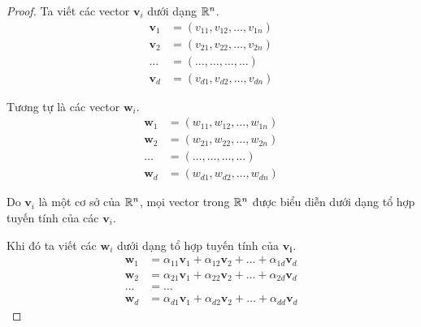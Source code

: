 \begin{proof}
    Ta viết các vector $\bm{v}_i$ dưới dạng $\mathbb{R}^n$.
    \begin{align*}
        \bm{v}_1 & = (v_{11}, v_{12}, \ldots, v_{1n}) \\
        \bm{v}_2 & = (v_{21}, v_{22}, \ldots, v_{2n}) \\
        \ldots & = (\ldots, \ldots, \ldots, \ldots) \\
        \bm{v}_d & = (v_{d1}, v_{d2}, \ldots, v_{dn})
    \end{align*}

    Tương tự là các vector $\bm{w}_i$.
    \begin{align*}
        \bm{w}_1 & = (w_{11}, w_{12}, \ldots, w_{1n}) \\
        \bm{w}_2 & = (w_{21}, w_{22}, \ldots, w_{2n}) \\
        \ldots & = (\ldots, \ldots, \ldots, \ldots) \\
        \bm{w}_d & = (w_{d1}, w_{d2}, \ldots, w_{dn})
    \end{align*}

    Do $\bm{v}_i$ là một cơ sở của $\mathbb{R}^n$, mọi vector trong $\mathbb{R}^n$ được biểu diễn dưới dạng tổ hợp tuyến tính của các $\bm{v}_i$.

    Khi đó ta viết các $\bm{w}_i$ dưới dạng tổ hợp tuyến tính của $\bm{v_i}$.
    \begin{align*}
        \bm{w}_1 & = \alpha_{11} \bm{v}_1 + \alpha_{12} \bm{v}_2 + \ldots + \alpha_{1d} \bm{v}_d \\
        \bm{w}_2 & = \alpha_{21} \bm{v}_1 + \alpha_{22} \bm{v}_2 + \ldots + \alpha_{2d} \bm{v}_d \\
        \ldots & = \ldots \\
        \bm{w}_d & = \alpha_{d1} \bm{v}_1 + \alpha_{d2} \bm{v}_2 + \ldots + \alpha_{dd} \bm{v}_d
    \end{align*}


\end{proof}
